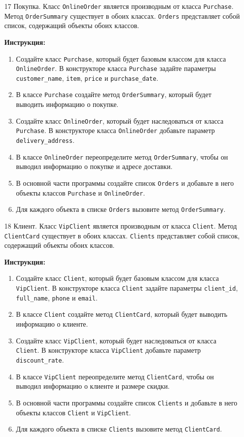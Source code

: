 \begin{enumerate}
\item[17]
Покупка. Класс \texttt{OnlineOrder} является производным от класса \texttt{Purchase}. Метод \texttt{OrderSummary} существует в обоих классах. \texttt{Orders} представляет собой список, содержащий объекты обоих классов.

\textbf{Инструкция:}
\begin{enumerate}
    \item Создайте класс \texttt{Purchase}, который будет базовым классом для класса \texttt{OnlineOrder}. В конструкторе класса \texttt{Purchase} задайте параметры \texttt{customer\_name}, \texttt{item}, \texttt{price} и \texttt{purchase\_date}.
    \item В классе \texttt{Purchase} создайте метод \texttt{OrderSummary}, который будет выводить информацию о покупке.
    \item Создайте класс \texttt{OnlineOrder}, который будет наследоваться от класса \texttt{Purchase}. В конструкторе класса \texttt{OnlineOrder} добавьте параметр \texttt{delivery\_address}.
    \item В классе \texttt{OnlineOrder} переопределите метод \texttt{OrderSummary}, чтобы он выводил информацию о покупке и адресе доставки.
    \item В основной части программы создайте список \texttt{Orders} и добавьте в него объекты классов \texttt{Purchase} и \texttt{OnlineOrder}.
    \item Для каждого объекта в списке \texttt{Orders} вызовите метод \texttt{OrderSummary}.
\end{enumerate}

\item[18]
Клиент. Класс \texttt{VipClient} является производным от класса \texttt{Client}. Метод \texttt{ClientCard} существует в обоих классах. \texttt{Clients} представляет собой список, содержащий объекты обоих классов.

\textbf{Инструкция:}
\begin{enumerate}
    \item Создайте класс \texttt{Client}, который будет базовым классом для класса \texttt{VipClient}. В конструкторе класса \texttt{Client} задайте параметры \texttt{client\_id}, \texttt{full\_name}, \texttt{phone} и \texttt{email}.
    \item В классе \texttt{Client} создайте метод \texttt{ClientCard}, который будет выводить информацию о клиенте.
    \item Создайте класс \texttt{VipClient}, который будет наследоваться от класса \texttt{Client}. В конструкторе класса \texttt{VipClient} добавьте параметр \texttt{discount\_rate}.
    \item В классе \texttt{VipClient} переопределите метод \texttt{ClientCard}, чтобы он выводил информацию о клиенте и размере скидки.
    \item В основной части программы создайте список \texttt{Clients} и добавьте в него объекты классов \texttt{Client} и \texttt{VipClient}.
    \item Для каждого объекта в списке \texttt{Clients} вызовите метод \texttt{ClientCard}.
\end{enumerate}


\end{enumerate}
